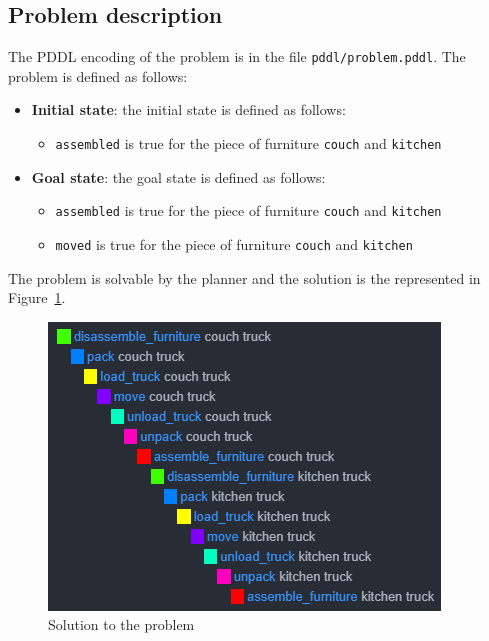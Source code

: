 \documentclass[12pt]{article}
\begin{document}
    \subsection{Problem description}\label{subsec:pddl-problem}
    The PDDL encoding of the problem is in the file \texttt{pddl/problem.pddl}.
    The problem is defined as follows:
    \begin{itemize}
        \item \textbf{Initial state}: the initial state is defined as follows:
        \begin{itemize}
            \item \texttt{assembled} is true for the piece of furniture \texttt{couch} and \texttt{kitchen}
        \end{itemize}
        \item \textbf{Goal state}: the goal state is defined as follows:
        \begin{itemize}
            \item \texttt{assembled} is true for the piece of furniture \texttt{couch} and \texttt{kitchen}
            \item \texttt{moved} is true for the piece of furniture \texttt{couch} and \texttt{kitchen}
        \end{itemize}
    \end{itemize}
    The problem is solvable by the planner and the solution is the represented in Figure~\ref{fig:pddl-solution}.
    \begin{figure}[ht]
        \centering
        \includegraphics[width=\textwidth]{../img/pddl_problem_solution}
        \caption{Solution to the problem}
        \label{fig:pddl-solution}
    \end{figure}
\end{document}
